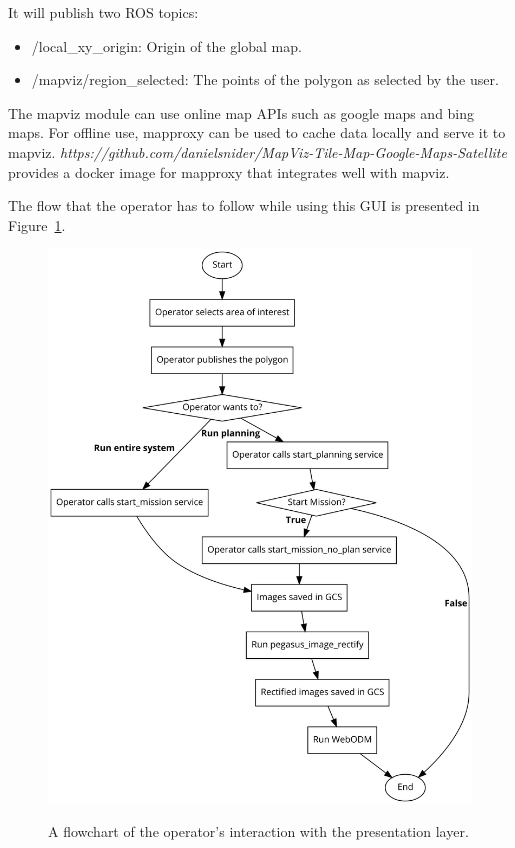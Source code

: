 It will publish two ROS topics:
\begin{itemize}
	\item /local\_xy\_origin: Origin of the global map.
	\item /mapviz/region\_selected: The points of the polygon as selected by the user.
\end{itemize}

The mapviz module can use online map APIs such as google maps and bing maps. For offline use, mapproxy can be used to cache data locally and serve it to mapviz. \textit{https://github.com/danielsnider/MapViz-Tile-Map-Google-Maps-Satellite} provides a docker image for mapproxy that integrates well with mapviz.

The flow that the operator has to follow while using this GUI is presented in Figure~\ref{fig:presentation-flow}.

\begin{figure}
	\centering
	\caption[Operator interaction with pegasus system]{\small A flowchart of the operator's interaction with the presentation layer.}
	\includegraphics[width=5in]{figures/methodology/presentation/presentation-flow}
	\label{fig:presentation-flow}
\end{figure}


